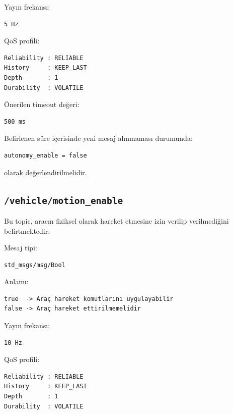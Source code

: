\documentclass[12pt,a4paper]{article}
\begin{document}
Yayın frekansı:

\begin{verbatim}
5 Hz
\end{verbatim}

QoS profili:

\begin{verbatim}
Reliability : RELIABLE
History     : KEEP_LAST
Depth       : 1
Durability  : VOLATILE
\end{verbatim}

Önerilen timeout değeri:

\begin{verbatim}
500 ms
\end{verbatim}

Belirlenen süre içerisinde yeni mesaj alınmaması durumunda:

\begin{verbatim}
autonomy_enable = false
\end{verbatim}

olarak değerlendirilmelidir.

\subsection{\texttt{/vehicle/motion\_enable}}

Bu topic, aracın fiziksel olarak hareket etmesine izin verilip
verilmediğini belirtmektedir.

Mesaj tipi:

\begin{verbatim}
std_msgs/msg/Bool
\end{verbatim}

Anlamı:

\begin{verbatim}
true  -> Araç hareket komutlarını uygulayabilir
false -> Araç hareket ettirilmemelidir
\end{verbatim}

Yayın frekansı:

\begin{verbatim}
10 Hz
\end{verbatim}

QoS profili:

\begin{verbatim}
Reliability : RELIABLE
History     : KEEP_LAST
Depth       : 1
Durability  : VOLATILE
\end{verbatim}
\end{document}
